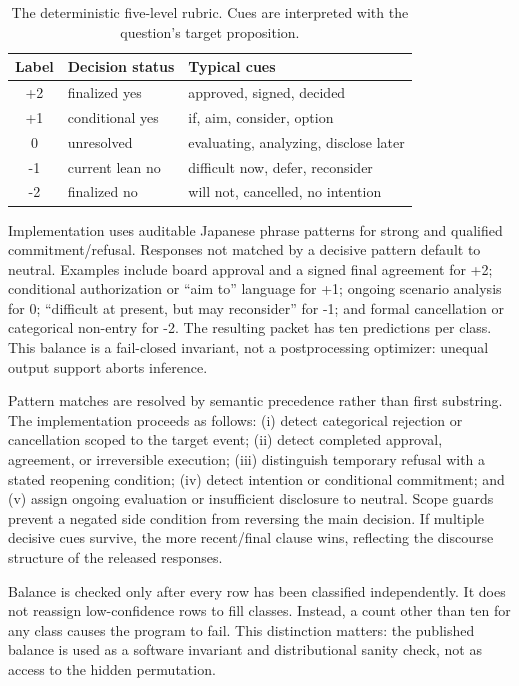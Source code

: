 \documentclass[11pt]{article}
\begin{document}
\begin{table}[t]
\centering
\small
\setlength{\tabcolsep}{3pt}
\begin{tabular}{@{}cp{}p{}@{}}
\toprule
Label & Decision status & Typical cues \\
\midrule
+2 & finalized yes & approved, signed, decided \\
+1 & conditional yes & if, aim, consider, option \\
0 & unresolved & evaluating, analyzing, disclose later \\
-1 & current lean no & difficult now, defer, reconsider \\
-2 & finalized no & will not, cancelled, no intention \\
\bottomrule
\end{tabular}
\caption{The deterministic five-level rubric. Cues are interpreted with the question's target proposition.}
\label{tab:rubric}
\end{table}

Implementation uses auditable Japanese phrase patterns for strong and qualified commitment/refusal. Responses not matched by a decisive pattern default to neutral. Examples include board approval and a signed final agreement for +2; conditional authorization or ``aim to'' language for +1; ongoing scenario analysis for 0; ``difficult at present, but may reconsider'' for -1; and formal cancellation or categorical non-entry for -2. The resulting packet has ten predictions per class. This balance is a fail-closed invariant, not a postprocessing optimizer: unequal output support aborts inference.

Pattern matches are resolved by semantic precedence rather than first substring.
The implementation proceeds as follows: (i) detect categorical rejection or
cancellation scoped to the target event; (ii) detect completed approval,
agreement, or irreversible execution; (iii) distinguish temporary refusal with
a stated reopening condition; (iv) detect intention or conditional commitment;
and (v) assign ongoing evaluation or insufficient disclosure to neutral.  Scope
guards prevent a negated side condition from reversing the main decision.  If
multiple decisive cues survive, the more recent/final clause wins, reflecting
the discourse structure of the released responses.

Balance is checked only after every row has been classified independently.  It
does not reassign low-confidence rows to fill classes.  Instead, a count other
than ten for any class causes the program to fail.  This distinction matters:
the published balance is used as a software invariant and distributional
sanity check, not as access to the hidden permutation.
\end{document}
